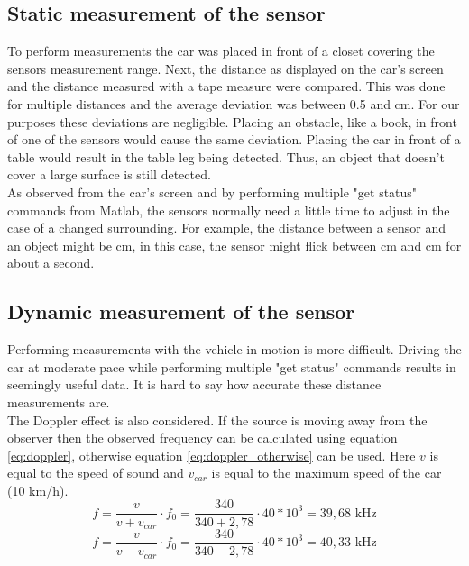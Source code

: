 \documentclass[final]{scrreprt} %
\begin{document}
\subsection{Static measurement of the sensor}

To perform measurements the car was placed in front of a closet covering the sensors measurement range. 
Next, the distance as displayed on the car's screen and the distance measured with a tape measure were compared. 
This was done for multiple distances and the average deviation was between 0.5 and \unit[1]{cm}. 
For our purposes these deviations are negligible. 
Placing an obstacle, like a book, in front of one of the sensors would cause the same deviation.
Placing the car in front of a table would result in the table leg being detected. 
Thus, an object that doesn't cover a large surface is still detected.\\ 
As observed from the car's screen and by performing multiple "get status" commands from Matlab, the sensors normally need a little time to adjust in the case of a changed surrounding. 
For example, the distance between a sensor and an object might be \unit[75]{cm}, in this case, the sensor might flick between \unit[75]{cm} and \unit[74]{cm} for about a second.


\subsection{Dynamic measurement of the sensor}

Performing measurements with the vehicle in motion is more difficult. Driving the car at moderate pace while performing multiple "get status" commands results in seemingly useful data. 
It is hard to say how accurate these distance measurements are.\\ 
The Doppler effect is also considered. 
If the source is moving away from the observer then the observed frequency can be calculated using equation \ref{eq:doppler}, otherwise equation \ref{eq:doppler_otherwise} can be used. Here $v$ is equal to the speed of sound and $v_{car}$ is equal to the maximum speed of the car (10 km/h).
\begin{equation} 
\label{eq:doppler}
f = \dfrac{v}{v+v_{car}} \cdot f_{0} = \dfrac{340}{340 + 2,78} \cdot {40*10^3} = 39,68 \text{ kHz}
\end{equation}
\begin{equation} 
\label{eq:doppler_otherwise}
f = \dfrac{v}{v-v_{car}} \cdot f_{0} = \dfrac{340}{340 - 2,78} \cdot {40*10^3} = 40,33 \text{ kHz}
\end{equation}
\end{document}
